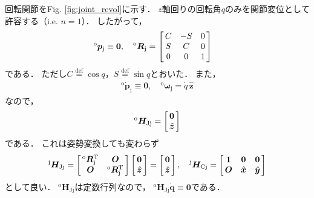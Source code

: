 ﻿\documentclass[a4paper]{jsarticle}
\begin{document}
回転関節をFig. \ref{fig:joint_revol}に示す．
$z$軸回りの回転角$q$のみを関節変位として許容する（i.e. $n=1$）．
したがって，
\begin{align*}
&{}^{\mathrm{o}}\bm{p}_{\mathrm{j}}\equiv\bm{0},\quad
{}^{\mathrm{o}}\bm{R}_{\mathrm{j}}=\left[\begin{array}{@{\,}ccc@{\,}}
 C &-S & 0 \\
 S & C & 0 \\
 0 & 0 & 1 \\
\end{array}\right]
\end{align*}
である．
ただし$C\overset{\mathrm{def}}{=}\cos q$，$S\overset{\mathrm{def}}{=}\sin q$とおいた．
また，
\begin{align*}
{}^{\mathrm{o}}\dot{\bm{p}}_{\mathrm{j}}\equiv\bm{0},\quad
{}^{\mathrm{o}}\bm{\omega}_{\mathrm{j}}=\dot{q}\,\hat{\bm{z}}
\end{align*}
なので，
\begin{align*}
{}^{\mathrm{o}}\bm{H}_{\mathrm{Jj}}=\left[\begin{array}{@{\,}c@{\,}}
 \bm{0} \\ \hat{\bm{z}}
\end{array}\right]
\end{align*}
である．
これは姿勢変換しても変わらず
\begin{align*}
{}^{\mathrm{j}}\bm{H}_{\mathrm{Jj}}=\left[\begin{array}{@{\,}cc@{\,}}
 {}^{\mathrm{o}}\bm{R}_{\mathrm{j}}^{\mathrm{T}} & \bm{O} \\
 \bm{O} & {}^{\mathrm{o}}\bm{R}_{\mathrm{j}}^{\mathrm{T}} \\
\end{array}\right]\left[\begin{array}{@{\,}c@{\,}}
 \bm{0} \\ \hat{\bm{z}}
\end{array}\right]=\left[\begin{array}{@{\,}c@{\,}}
 \bm{0} \\ \hat{\bm{z}}
\end{array}\right],\quad
{}^{\mathrm{j}}\bm{H}_{\mathrm{Cj}}=\left[\begin{array}{@{\,}ccc@{\,}}
 \bm{1} & \bm{0} & \bm{0} \\
 \bm{O} & \hat{\bm{x}} & \hat{\bm{y}}
\end{array}\right]
\end{align*}
として良い．
${}^{\mathrm{o}}\bm{H}_{\mathrm{Jj}}$は定数行列なので，
${}^{\mathrm{o}}\dot{\bm{H}}_{\mathrm{Jj}}\dot{\bm{q}}\equiv\bm{0}$である．
\end{document}
